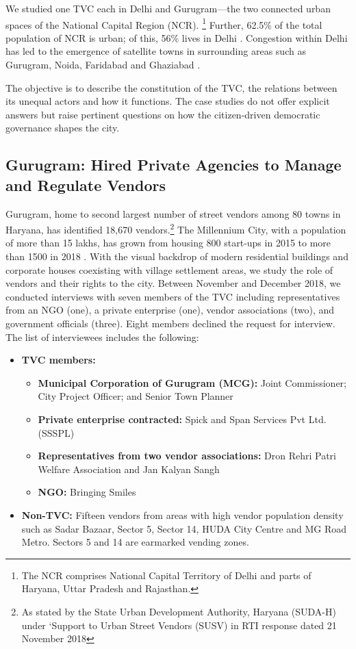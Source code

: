 \documentclass[a4paper, 12pt, twoside]{article}
\begin{document}
{We studied one TVC each in Delhi and Gurugram—the two connected urban spaces of the National Capital Region (NCR). \footnote{The NCR comprises National Capital Territory of Delhi and parts of Haryana, Uttar Pradesh and Rajasthan.} Further, 62.5\% of the total population of NCR is urban; of this, 56\% lives in Delhi \parencite{ncrpbreport}. Congestion within Delhi has led to the emergence of satellite towns in surrounding areas such as Gurugram, Noida, Faridabad and Ghaziabad \parencite{kpmgreport}.

The objective is to describe the constitution of the TVC, the relations between its unequal actors and how it functions. The case studies do not offer explicit answers but raise pertinent questions on how the citizen-driven democratic governance shapes the city.

\subsection*{Gurugram: Hired Private Agencies to Manage and Regulate Vendors}

Gurugram, home to second largest number of street vendors among 80 towns in Haryana, has identified 18,670 vendors.\footnote{As stated by the State Urban Development Authority, Haryana (SUDA-H) under ‘Support to Urban Street Vendors (SUSV) in RTI response dated 21 November 2018} The Millennium City, with a population of more than 15 lakhs, has grown from housing 800 start-ups in 2015 to more than 1500 in 2018 \parencite{vermanews}. With the visual backdrop of modern residential buildings and corporate houses coexisting with village settlement areas, we study the role of vendors and their rights to the city.
Between November and December 2018, we conducted interviews with seven members of the TVC including representatives from an NGO (one), a private enterprise (one), vendor associations (two), and government officials (three). Eight members declined the request for interview. The list of interviewees includes the following:

\begin{itemize}
\item \textbf{TVC members:}
	\begin{itemize}
	\item \textbf{Municipal Corporation of Gurugram (MCG):} Joint Commissioner; City Project Officer; and Senior Town Planner
	\item \textbf{Private enterprise contracted:} Spick and Span Services Pvt Ltd. (SSSPL)
	\item \textbf{Representatives from two vendor associations:} Dron Rehri Patri Welfare Association and Jan Kalyan Sangh
	\item \textbf{NGO:} Bringing Smiles
	\end{itemize}
\item \textbf{Non-TVC:} Fifteen vendors from areas with high vendor population density such as Sadar Bazaar, Sector 5, Sector 14, HUDA City Centre and MG Road Metro. Sectors 5 and 14 are earmarked vending zones.
\end{itemize}

}
\end{document}
